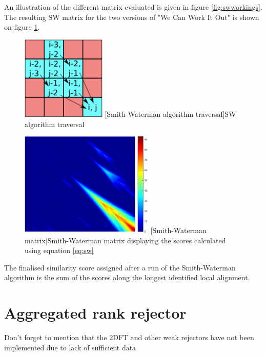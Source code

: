 An illustration of the different matrix evaluated is given in figure
\ref{fig:swworkings}. The resulting SW matrix for the two versions of "We Can
Work It Out" is shown on figure \ref{fig:swmatrix}.
\begin{figure}[H]
    \centering
    \begin{minipage}{.5\textwidth}
      \centering
      \includegraphics[height=4cm, keepaspectratio]{Algorithms/swworkings.png}
      [Smith-Waterman algorithm traversal]{SW algorithm traversal}
      \label{fig:swworkings}
    \end{minipage}%
    \begin{minipage}{.5\textwidth}
      \centering
      \includegraphics[height=5cm, keepaspectratio]{Algorithms/swmatrix.png}
      [Smith-Waterman matrix]{Smith-Waterman matrix displaying the scores calculated using equation \ref{eq:sw}}
      \label{fig:swmatrix}
    \end{minipage}
 \end{figure}

The finalised similarity score assigned after a run of the Smith-Waterman
algorithm is the sum of the scores along the longest identified local alignment.

\section{Aggregated rank rejector} 
\label{sec:rankaggregation}

Don't forget to mention that the 2DFT and other weak rejectors have not been
implemented due to lack of sufficient data

